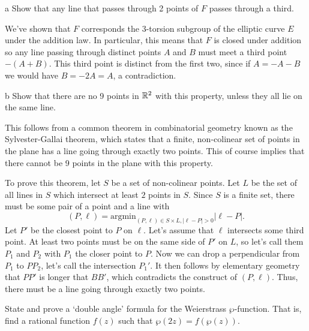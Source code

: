 \documentclass{pset}
\begin{document}
\begin{parts}
  \begin{part}{a}
    Show that any line that passes through 2 points of $F$ passes through a third.
  \end{part}

  We've shown that $F$ corresponds the $3$-torsion subgroup of the elliptic curve $E$ under the addition law. In particular, this means that $F$ is closed under addition so any line passing through distinct points $A$ and $B$ must meet a third point $-(A+B)$. This third point is distinct from the first two, since if $A=-A-B$ we would have $B=-2A=A$, a contradiction.

  \begin{part}{b}
    Show that there are no 9 points in $\mathbb{R}^2$ with this property, unless they all lie on the same line.
  \end{part}

  This follows from a common theorem in combinatorial geometry known as the Sylvester-Gallai theorem, which states that a finite, non-colinear set of points in the plane has a line going through exactly two points. This of course implies that there cannot be 9 points in the plane with this property.

  To prove this theorem, let $S$ be a set of non-colinear points. Let $L$ be the set of all lines in $S$ which intersect at least $2$ points in $S$. Since $S$ is a finite set, there must be some pair of a point and a line with
  \[
    (P, \ell) = \textrm{argmin}_{(P,\ell)\in S\times L, |\ell-P|>0} | \ell -P|.
  \]
  Let $P'$ be the closest point to $P$ on $\ell$. Let's assume that $\ell$ intersects some third point. At least two points must be on the same side of $P'$ on $L$, so let's call them $P_1$ and $P_2$ with $P_1$ the closer point to $P$. Now we can drop a perpendicular from $P_1$ to $PP_2$, let's call the intersection $P_1'$. It then follows by elementary geometry that $PP'$ is longer that $BB'$, which contradicts the construct of $(P,\ell)$. Thus, there must be a line going through exactly two points.
\end{parts}

\begin{problem}{5.13}
  State and prove a `double angle' formula for the Weierstrass $\wp$-function. That is, find a rational function $f(z)$ such that $\wp(2z)=f(\wp(z))$.
\end{problem}
\end{document}
